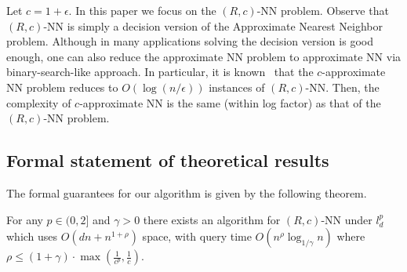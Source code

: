 \documentclass[12pt]{article}
\newcommand{\MS}{{\cal M}}
\begin{document}

Let $c=1+\epsilon$.
In this paper we focus on the $(R,c)$-NN problem.
Observe that $(R,c)$-NN is simply a decision version of the Approximate Nearest Neighbor problem.
Although in many applications solving the decision version is good enough, one can also reduce the approximate NN problem to approximate NN via binary-search-like approach.
In particular, it is known~\cite{IM,HP} that
the $c$-approximate NN problem reduces  to
$O(\log (n/\epsilon))$ instances of
$(R,c)$-NN.
Then, the complexity of $c$-approximate NN is the
same (within log factor) as that of the $(R,c)$-NN problem.


\iffalse

\subsection{Formal statement of theoretical results}
\label{ss:formal}

The formal guarantees for our algorithm is given by the following theorem.

\begin{theorem}
For any $p \in (0,2]$ and $\gamma>0$ there exists an algorithm for $(R,c)$-NN under $l_d^p$
which uses  $O(d n +  n^{1+\rho})$ space, with query time 
$O(n^{\rho} \log_{1/\gamma} n)$
where $\rho\le (1+\gamma)\cdot\max\left(\frac{1}{c^p}, \frac{1}{c}\right)$.
\end{theorem}
\end{document}
